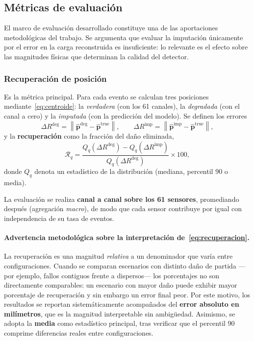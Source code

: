\subsection{Métricas de evaluación}
\label{subsec:metricas}

El marco de evaluación desarrollado constituye una de las aportaciones metodológicas del trabajo.
Se argumenta que evaluar la imputación únicamente por el error en la carga reconstruida es
insuficiente: lo relevante es el efecto sobre las magnitudes físicas que determinan la calidad del
detector.

\subsubsection{Recuperación de posición}
\label{subsec:met-posicion}

Es la métrica principal. Para cada evento se calculan tres posiciones mediante~\eqref{eq:centroide}:
la \emph{verdadera} (con los 61 canales), la \emph{degradada} (con el canal a cero) y la
\emph{imputada} (con la predicción del modelo). Se definen los errores
\begin{equation}
    \Delta R^{\text{deg}} = \left\| \hat{\mathbf{p}}^{\text{deg}} - \hat{\mathbf{p}}^{\text{true}} \right\|,
    \qquad
    \Delta R^{\text{imp}} = \left\| \hat{\mathbf{p}}^{\text{imp}} - \hat{\mathbf{p}}^{\text{true}} \right\|,
\end{equation}
y la \textbf{recuperación} como la fracción del daño eliminada,
\begin{equation}
    \mathcal{R}_q = \frac{Q_q(\Delta R^{\text{deg}}) - Q_q(\Delta R^{\text{imp}})}
                         {Q_q(\Delta R^{\text{deg}})} \times 100,
    \label{eq:recuperacion}
\end{equation}
donde $Q_q$ denota un estadístico de la distribución (mediana, percentil 90 o media).

La evaluación se realiza \textbf{canal a canal sobre los 61 sensores}, promediando después
(agregación \emph{macro}), de modo que cada sensor contribuye por igual con independencia de su tasa
de eventos.

\paragraph{Advertencia metodológica sobre la interpretación de~\eqref{eq:recuperacion}.} La
recuperación es una magnitud \emph{relativa} a un denominador que varía entre configuraciones.
Cuando se comparan escenarios con distinto daño de partida ---por ejemplo, fallos contiguos frente a
dispersos--- los porcentajes no son directamente comparables: un escenario con mayor daño puede
exhibir mayor porcentaje de recuperación y sin embargo un error final peor. Por este motivo, los
resultados se reportan sistemáticamente acompañados del \textbf{error absoluto en milímetros}, que
es la magnitud interpretable sin ambigüedad. Asimismo, se adopta la \textbf{media} como estadístico
principal, tras verificar que el percentil 90 comprime diferencias reales entre configuraciones.

